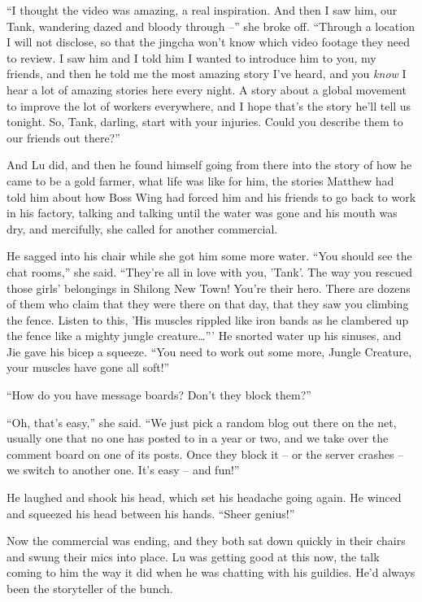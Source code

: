 ``I thought the video was amazing, a real inspiration. And then I
saw him, our Tank, wandering dazed and bloody through --'' she broke
off. ``Through a location I will not disclose, so that the jingcha
won't know which video footage they need to review. I saw him and I
told him I wanted to introduce him to you, my friends, and then he
told me the most amazing story I've heard, and you \emph{know} I
hear a lot of amazing stories here every night. A story about a
global movement to improve the lot of workers everywhere, and I
hope that's the story he'll tell us tonight. So, Tank, darling,
start with your injuries. Could you describe them to our friends
out there?''

And Lu did, and then he found himself going from there into the
story of how he came to be a gold farmer, what life was like for
him, the stories Matthew had told him about how Boss Wing had
forced him and his friends to go back to work in his factory,
talking and talking until the water was gone and his mouth was dry,
and mercifully, she called for another commercial.

He sagged into his chair while she got him some more water. ``You
should see the chat rooms,'' she said. ``They're all in love with
you, 'Tank'. The way you rescued those girls' belongings in Shilong
New Town! You're their hero. There are dozens of them who claim
that they were there on that day, that they saw you climbing the
fence. Listen to this, 'His muscles rippled like iron bands as he
clambered up the fence like a mighty jungle creature\ldots{}''' He
snorted water up his sinuses, and Jie gave his bicep a squeeze.
``You need to work out some more, Jungle Creature, your muscles have
gone all soft!''

``How do you have message boards? Don't they block them?''

``Oh, that's easy,'' she said. ``We just pick a random blog out there
on the net, usually one that no one has posted to in a year or two,
and we take over the comment board on one of its posts. Once they
block it -- or the server crashes -- we switch to another one. It's
easy -- and fun!''

He laughed and shook his head, which set his headache going again.
He winced and squeezed his head between his hands. ``Sheer genius!''

Now the commercial was ending, and they both sat down quickly in
their chairs and swung their mics into place. Lu was getting good
at this now, the talk coming to him the way it did when he was
chatting with his guildies. He'd always been the storyteller of the
bunch.

